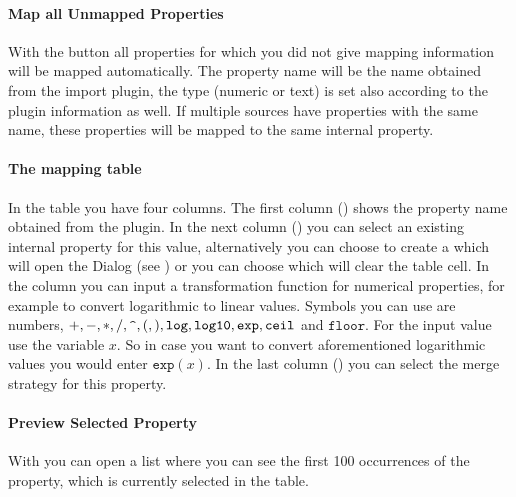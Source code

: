 \paragraph{Map all Unmapped Properties}
With the  button all properties for which you
did not give  mapping information will be mapped automatically. The property
name will be the name obtained from the import plugin, the type (numeric or
text) is set also according to the plugin information as well. If multiple
sources have properties with the same name, these properties will be mapped to
the same internal property.



\paragraph{The mapping table}
In the table you have four columns. The first column ()
shows  the property name obtained from the plugin. In the next column
() you can select an existing internal property for this value,
alternatively you can choose to create a  which will
open the  Dialog (see
) or you can choose  which will clear the table cell. In the  column
you can input a transformation function for numerical properties, for example to
convert logarithmic to linear values. Symbols you can use are numbers, $+, -, *,
/, \verb+^+, (, ), \mathtt{log}, \mathtt{log10}, \mathtt{exp}, \mathtt{ceil}$ and
$\mathtt{floor}$. For the input value use the variable $x$. So in case you want to
convert aforementioned logarithmic values you would enter $\mathtt{exp}(x)$. In
the last column () you can select the merge strategy for
this property. 

\paragraph{Preview Selected Property} With  you can open a list where you can see the first 100 occurrences of the
property, which is currently selected in the table.

